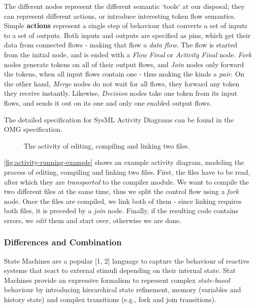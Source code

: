 The different nodes represent the different semantic `tools` at our disposal; they can represent different actions, or introduce interesting token flow semantics.
Simple \textbf{actions} represent a single step of behaviour that converts a set of inputs to a set of outputs. Both inputs and outputs are specified as pins, which get their data from connected flows - making that flow a \emph{data flow}. The flow is started from the initial node, and is ended with a \emph{Flow Final} or \emph{Activity Final} node. \emph{Fork} nodes generate tokens on all of their output flows, and \emph{Join} nodes only forward the tokens, when all input flows contain one - thus making the kinds a \emph{pair}. On the other hand, \emph{Merge} nodes do not wait for all flows, they forward any token they receive instantly. Likewise, \emph{Decision} nodes take one token from its input flows, and sends it out on its one and only one enabled output flows.

The detailed specification for SysML Activity Diagrams can be found in the OMG specification\cite{omg_sysml}.

\begin{figure}[!ht]
	\centering
	
	\caption{The activity of editing, compiling and linking two files.}
	\label{fig:activity-running-example}
\end{figure}

\autoref{fig:activity-running-example} shows an example activity diagram, modeling the process of editing, compiling and linking two files. First, the files have to be read, after which they are \emph{transported} to the compiler module. We want to compile the two different files at the same time, thus we split the control flow using a \emph{fork} node. Once the files are compiled, we link both of them - since linking requires both files, it is preceded by a \emph{join} node. Finally, if the resulting code contains errors, we \emph{edit} them and start over, otherwise we are done.

\iffalse
\subsubsection{Differences and Combination}

State Machines are a popular [1, 2] language to capture the behaviour
of reactive systems\cite{HAREL1987231} that react to external stimuli depending on
their internal state. Stat Machines provide an expressive formalism to
represent complex \emph{state-based} behaviour by introducing hierarchical
state refinement, memory (variables and history state) and complex
transitions (e.g., fork and join transitions).

